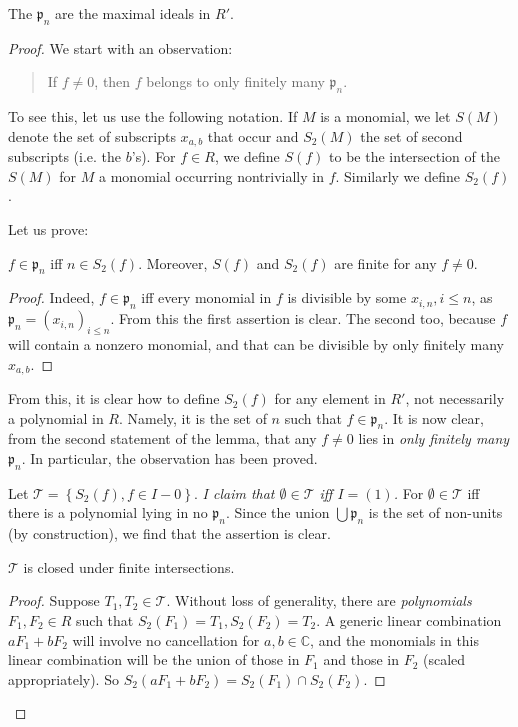 \begin{lemma} 
The $\mathfrak{p}_n$ are the maximal ideals in $R'$.
\end{lemma} 
\begin{proof} 
We start with an observation:
\begin{quote}
If $f \neq 0 $, then $f$ belongs to only finitely many $\mathfrak{p}_n$.
\end{quote}
To see this, let us use the following notation. If $M$ is a monomial, we let
$S(M)$ denote the set of subscripts $x_{a,b}$ that occur and $S_2(M)$ the set
of second subscripts (i.e. the $b$'s). 
For $f \in R$, we define $S(f)$ to be the intersection of the $S(M)$ for $M$ a
monomial occurring nontrivially in $f$. Similarly we define $S_2(f)$.

Let us prove:
\begin{lemma} 
$f \in \mathfrak{p}_n$ iff $n \in S_2(f)$. Moreover, $S(f)$ and $S_2(f)$ are
finite for any $f \neq 0$.
\end{lemma} 
\begin{proof} 
Indeed, $f \in \mathfrak{p}_n$ iff every monomial in $f$ is divisible by some
$x_{i,n}, i \leq n$, as $\mathfrak{p}_n  = (x_{i,n})_{i \leq n}$. From this the first assertion is clear. The second too,
because $f$ will contain a nonzero monomial, and that can be divisible by only
finitely many $x_{a,b}$.
\end{proof} 
From this, it is clear how to define $ S_2(f)$ for any element in $R'$,
not necessarily a polynomial in $R$. Namely, it is the set of $n$ such that $f
\in \mathfrak{p}_n$. 
It is now clear, from the second statement of the lemma, that any $f \neq 0$ lies in \emph{only finitely many
$\mathfrak{p}_n$}. In particular, the observation has been proved. 

Let $\mathcal{T} = \left\{ S_2(f), f \in I - 0\right\}$. \emph{I claim that
$\emptyset \in \mathcal{T}$ iff $I = (1)$.} For $\emptyset \in \mathcal{T}$ iff
there is a polynomial lying in no $\mathfrak{p}_n$. Since the union $\bigcup
\mathfrak{p}_n$ is the set of non-units (by construction), we find that the
assertion is clear.


\begin{lemma} 
$\mathcal{T}$ is closed under finite intersections.
\end{lemma} 
\begin{proof} 
Suppose $T_1, T_2 \in \mathcal{T}$. Without loss of generality, there are
\emph{polynomials} $F_1, F_2 \in R$ such that $S_2(F_1) = T_1, S_2(F_2) = T_2$.
A generic linear combination $a F_1 + bF_2$ will involve no cancellation for
$a, b \in \mathbb{C}$, and
the monomials in this linear combination will be the union of those in $F_1$
and those in $F_2$ (scaled appropriately). So $S_2(aF_1 + bF_2) = S_2(F_1) \cap S_2(F_2)$.
\end{proof} 


\end{proof}
